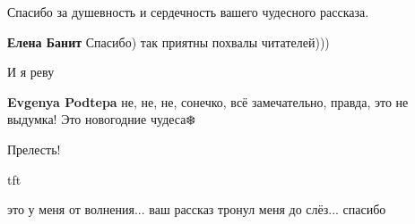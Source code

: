 \begin{itemize}
Спасибо за душевность и сердечность вашего чудесного рассказа.

\textbf{Елена Банит} Спасибо) так приятны похвалы читателей)))

И я реву

\begin{itemize} %
\textbf{Evgenya Podtepa} не, не, не, сонечко, всё замечательно, правда, это не выдумка! Это новогодние чудеса❄️
\end{itemize} %

Прелесть!

tft

\begin{itemize} %
это у меня от волнения... ваш рассказ тронул меня до слёз... спасибо
\end{itemize} %

\end{itemize} %
